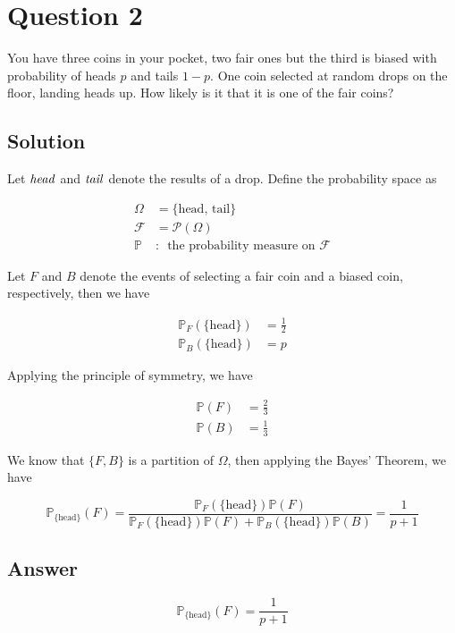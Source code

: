 \documentclass[12pt]{article}
\newcommand{\bP}{\mathbb{P}}
\begin{document}
	
	\section*{Question 2}
	
	\noindent You have three coins in your pocket, two fair ones but the third is biased with probability of heads $p$ and tails $1-p$. One coin selected at random drops on the floor, landing heads up. How likely is it that it is one of the fair coins?
		
	\subsection*{Solution}
	
		Let $\it{head}$ and $\it{tail}$ denote the results of a drop. Define the probability space as
	
		\[
		\begin{aligned}
			\Omega &= \{\mathrm{head},\,\mathrm{tail}\}\\
			\mathcal{F} &= \mathcal{P}(\Omega)\\
			\bP &:\enspace \text{the probability measure on $\mathcal{F}$}
		\end{aligned}
		\]
		
		Let $F$ and $B$ denote the events of selecting a fair coin and a biased coin, respectively, then we have
		
		\[
		\begin{aligned}
			\bP_F(\{\mathrm{head}\}) &= \frac{1}{2}\\
			\bP_B(\{\mathrm{head}\}) &= p
		\end{aligned}
		\]
		
		Applying the principle of symmetry, we have
		
		\[
		\begin{aligned}
			\bP(F) &= \frac{2}{3}\\
			\bP(B) &= \frac{1}{3}
		\end{aligned}
		\]
		
		We know that $\{F,B\}$ is a partition of $\Omega$, then applying the Bayes’ Theorem, we have
		
		\[{\bP_{\{\mathrm{head}\}}}(F) = \frac{\bP_F(\{\mathrm{head}\})\bP(F)}{\bP_F(\{\mathrm{head}\})\bP(F) + \bP_B(\{\mathrm{head}\})\bP(B)} = \frac{1}{p+1}\]
	
	\subsection*{Answer}
	
		\[\boxed{{\bP_{\{\mathrm{head}\}}}(F) = \frac{1}{p+1}}\]
\end{document}
